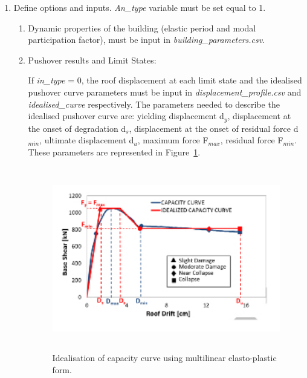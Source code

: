 \begin{enumerate}
\item Define options and inputs. \textit{An\_type} variable must be set equal to 1. 
\begin{enumerate}
\item Dynamic properties of the building (elastic period and modal participation factor), must be input in \textit{building\_parameters.csv}.

\item Pushover results and Limit States:

If \textit{in\_type} = 0, the roof displacement at each limit state and the idealised pushover curve parameters must be input in \textit{displacement\_profile.csv} and \textit{idealised\_curve} respectively. The 	parameters needed to describe the idealised pushover curve are: yielding displacement d$_y$, displacement at the onset of degradation d$_s$, displacement at the onset of residual force d$_{min}$, ultimate displacement d$_u$, maximum force F$_{max}$, residual force F$_{min}$. These parameters are represented in Figure~\ref{fig:quadrilinear}.

\begin{figure}[H]
\centering
\includegraphics[width=12cm,height=8cm]{./figures/quadrilinear.jpg}
\caption{Idealisation of capacity curve using multilinear elasto-plastic form.}
\label{fig:quadrilinear}
\end{figure}


\end{enumerate}
\end{enumerate}
